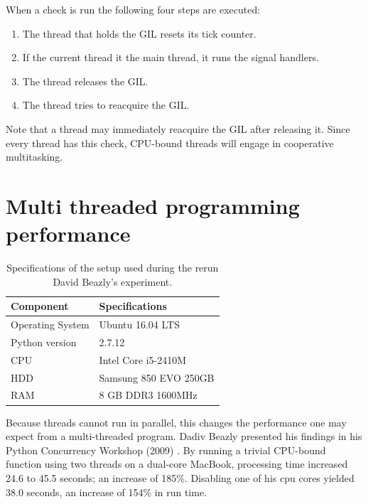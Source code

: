 

When a check is run the following four steps are executed:
\begin{enumerate}
	\item The thread that holds the GIL resets its tick counter.
	\item If the current thread it the main thread, it runs the signal handlers.
	\item The thread releases the GIL.
	\item The thread tries to reacquire the GIL.
\end{enumerate}

Note that a thread may immediately reacquire the GIL after releasing it.
Since every thread has this check, CPU-bound threads will engage in cooperative multitasking.

\section{Multi threaded programming performance}
\label{sct:multi_theaded_programming_performance}

\begin{table}[h]
	\centering
	\caption{Specifications of the setup used during the rerun David Beazly's experiment.}
	\label{table:rerun_beazily}
	\begin{tabular}{l|l}
		\textbf{Component} 	& \textbf{Specifications} \\ \hline
		Operating System   	& Ubuntu 16.04 LTS \\
		Python version		& 2.7.12 \\
		CPU					& Intel Core i5-2410M \\ 
		HDD					& Samsung 850 EVO 250GB  \\ 
		RAM					& 8 GB DDR3 1600MHz \\
	\end{tabular}
\end{table}

Because threads cannot run in parallel, this changes the performance one may expect from a multi-threaded program.
Dadiv Beazly presented his findings in his Python Concurrency Workshop (2009) \cite{beazley2009inside}.
By running a trivial CPU-bound function using two threads on a dual-core MacBook, processing time increased 24.6 to 45.5 seconds; an increase of 185\%.
Disabling one of his cpu cores yielded 38.0 seconds, an increase of 154\% in run time.

